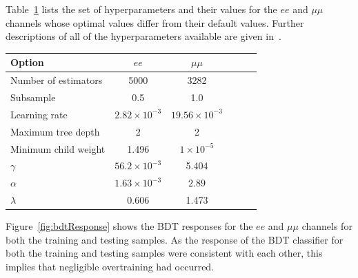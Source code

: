 Table~\ref{tab:hyperparameters} lists the set of hyperparameters and their values for the $ee$ and $\mu\mu$ channels whose optimal values differ from their default values.
Further descriptions of all of the hyperparameters available are given in~\cite{xgboost}.

\begin{table}[htbp]
\label{tab:hyperparameters}
  \centering
\begin{tabular}{lccccc}
   \hline
   \textbf{Option} & \textbf{$ee$} & \textbf{$\mu\mu$}\\
   \hline
    Number of estimators & 5000 & 3282 \\
    Subsample & 0.5 & 1.0 \\
    Learning rate & $2.82\times10^{-3}$ & $19.56\times10^{-3}$  \\
    Maximum tree depth & 2 & 2\\
    Minimum child weight & 1.496 & $1\times10^{-5}$ \\
    $\gamma$ & $56.2\times10^{-3}$ & 5.404 \\
    $\alpha$ & $1.63\times10^{-3}$ & $2.89$ \\
    $\lambda$ & 0.606 & 1.473 \\
   \hline
 \end{tabular}%
\end{table}

Figure~\ref{fig:bdtResponse} shows the BDT responses for the $ee$ and $\mu\mu$ channels for both the training and testing samples.
As the response of the BDT classifier for both the training and testing samples were consistent with each other, this implies that negligible overtraining had occurred. 

